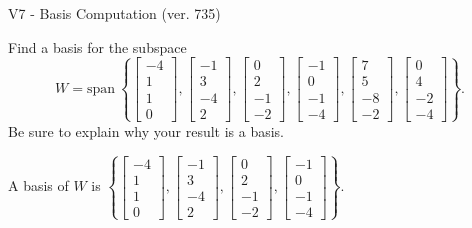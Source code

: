 \begin{exercise}
  \begin{exerciseTitle}V7 - Basis Computation (ver. 735)\end{exerciseTitle}
  \begin{exerciseStatement}
    Find a basis for the subspace 
\[W=\mathrm{span}\ \left\{\left[\begin{array}{r}
-4 \\
1 \\
1 \\
0
\end{array}\right] , \left[\begin{array}{r}
-1 \\
3 \\
-4 \\
2
\end{array}\right] , \left[\begin{array}{r}
0 \\
2 \\
-1 \\
-2
\end{array}\right] , \left[\begin{array}{r}
-1 \\
0 \\
-1 \\
-4
\end{array}\right] , \left[\begin{array}{r}
7 \\
5 \\
-8 \\
-2
\end{array}\right] , \left[\begin{array}{r}
0 \\
4 \\
-2 \\
-4
\end{array}\right]\right\}.\]
 Be sure to explain why your result is a basis.


  \end{exerciseStatement}
  \begin{exerciseAnswer}
   A basis of \(W\) is  \(\left\{\left[\begin{array}{r}
-4 \\
1 \\
1 \\
0
\end{array}\right] , \left[\begin{array}{r}
-1 \\
3 \\
-4 \\
2
\end{array}\right] , \left[\begin{array}{r}
0 \\
2 \\
-1 \\
-2
\end{array}\right] , \left[\begin{array}{r}
-1 \\
0 \\
-1 \\
-4
\end{array}\right]\right\}\).
  


  \end{exerciseAnswer}
\end{exercise}